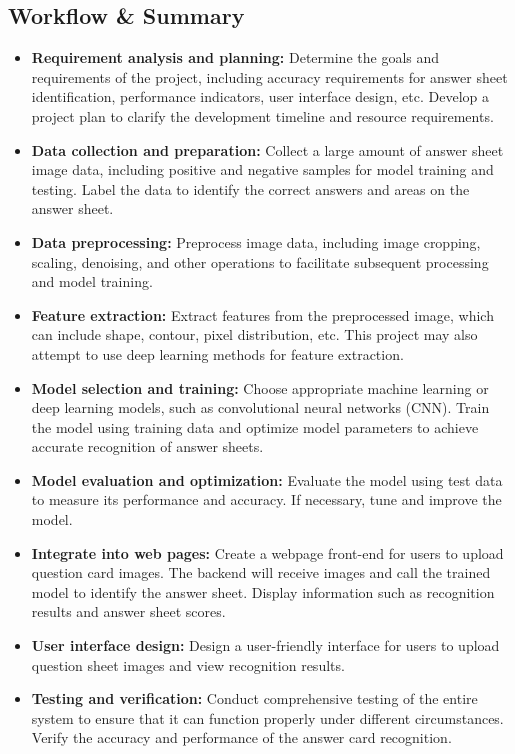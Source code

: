 \documentclass[twocolumn]{article}
\begin{document}
    \subsection{Workflow \& Summary}
    \begin{itemize}
        \item \textbf{ Requirement analysis and planning:} Determine the goals and requirements of the project, including accuracy requirements for answer sheet identification, performance indicators, user interface design, etc. Develop a project plan to clarify the development timeline and resource requirements.
        \item \textbf{Data collection and preparation:} Collect a large amount of answer sheet image data, including positive and negative samples for model training and testing. Label the data to identify the correct answers and areas on the answer sheet.
        \item \textbf{Data preprocessing:} Preprocess image data, including image cropping, scaling, denoising, and other operations to facilitate subsequent processing and model training.
        \item \textbf{Feature extraction:} Extract features from the preprocessed image, which can include shape, contour, pixel distribution, etc. This project may also attempt to use deep learning methods for feature extraction.
        \item \textbf{Model selection and training:} Choose appropriate machine learning or deep learning models, such as convolutional neural networks (CNN). Train the model using training data and optimize model parameters to achieve accurate recognition of answer sheets.
        \item \textbf{Model evaluation and optimization:} Evaluate the model using test data to measure its performance and accuracy. If necessary, tune and improve the model.
        \item \textbf{Integrate into web pages:} Create a webpage front-end for users to upload question card images. The backend will receive images and call the trained model to identify the answer sheet. Display information such as recognition results and answer sheet scores. 
        \item \textbf{User interface design:} Design a user-friendly interface for users to upload question sheet images and view recognition results.
        \item \textbf{Testing and verification:} Conduct comprehensive testing of the entire system to ensure that it can function properly under different circumstances. Verify the accuracy and performance of the answer card recognition.

\end{itemize}
\end{document}
